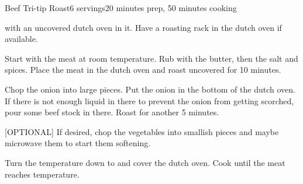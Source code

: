 \documentclass[../Cookbook.tex]{subfiles}
\begin{document}
\begin{recipe}{Beef Tri-tip Roast}{6 servings}{20 minutes prep, 50 minutes cooking}

	 with an uncovered dutch oven in it. Have a roasting rack in the dutch oven if available.

	Start with the meat at room temperature. Rub with the butter, then the salt and spices. Place the meat in the dutch oven and roast uncovered for 10 minutes.

	Chop the onion into large pieces. Put the onion in the bottom of the dutch oven. If there is not enough liquid in there to prevent the onion from getting scorched, pour some beef stock in there. Roast for another 5 minutes.

	[OPTIONAL] If desired, chop the vegetables into smallish pieces and maybe microwave them to start them softening.

	\newstep
	Turn the temperature down to  and cover the dutch oven. Cook until the meat reaches temperature.

\end{recipe}
\end{document}

